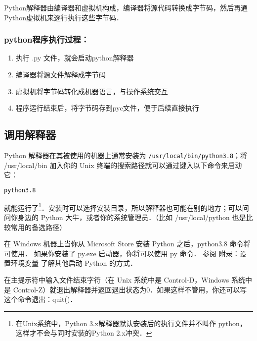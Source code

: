 
\begin{issues}
\issueTODO
\issueDraft
\end{issues}


Python解释器由编译器和虚拟机构成，编译器将源代码转换成字节码，然后再通Python虚拟机来逐行执行这些字节码．

\subsubsection{python程序执行过程：}

\begin{enumerate}
\item 执行 .py 文件，就会启动python解释器

\item 编译器将源文件解释成字节码

\item 虚拟机将字节码转化成机器语言，与操作系统交互

\item 程序运行结束后，将字节码存到pyc文件，便于后续直接执行
\end{enumerate}

\subsection{调用解释器}
Python 解释器在其被使用的机器上通常安装为 \verb|/usr/local/bin/python3.8|；将 /usr/local/bin 加入你的 Unix 终端的搜索路径就可以通过键入以下命令来启动它：

\begin{lstlisting}[language=bash]
python3.8
\end{lstlisting}

就能运行了\footnote{在Unix系统中，Python 3.x解释器默认安装后的执行文件并不叫作 python，这样才不会与同时安装的Python 2.x冲突．}．安装时可以选择安装目录，所以解释器也可能在别的地方；可以问问你身边的 Python 大牛，或者你的系统管理员．（比如 /usr/local/python 也是比较常用的备选路径）

在 Windows 机器上当你从 Microsoft Store 安装 Python 之后，python3.8 命令将可使用． 如果你安装了 py.exe 启动器，你将可以使用 py 命令． 参阅 附录：设置环境变量 了解其他启动 Python 的方式．

在主提示符中输入文件结束字符（在 Unix 系统中是 Control-D，Windows 系统中是 Control-Z）就退出解释器并返回退出状态为0．如果这样不管用，你还可以写这个命令退出：quit()．


